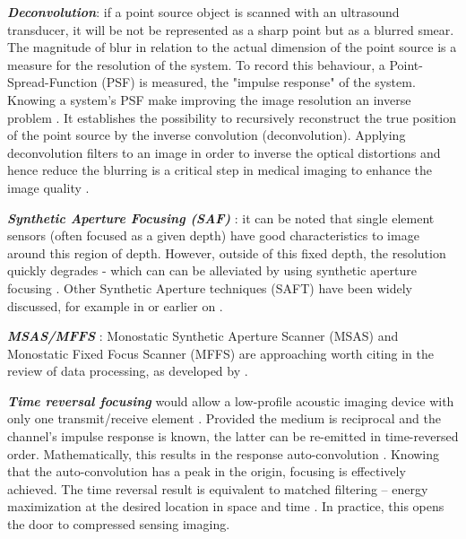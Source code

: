 \documentclass{article}
\begin{document}
\textbf{\textit{Deconvolution}}: if a point source object is scanned with an ultrasound transducer, it will be not be represented as a sharp point but as a blurred smear. The magnitude of blur in relation to the actual dimension of the point source is a measure for the resolution of the system. To record this behaviour, a Point-Spread-Function (PSF) is measured, the "impulse response" of the system.  Knowing a system’s PSF make improving the image resolution an inverse problem  \cite{jensen_deconvolution_1993,dalitz_point_2015}. It establishes the possibility to recursively reconstruct the true position of the point source by the inverse convolution (deconvolution). Applying deconvolution filters to an image in order to inverse the optical distortions and hence reduce the blurring is a critical step in medical imaging to enhance the image quality \cite{dalitz_point_2015}.

\textbf{\textit{Synthetic Aperture Focusing (SAF)}} : it can be noted that single element sensors (often focused as a given depth) have good characteristics to image around this region of depth. However, outside of this fixed depth, the resolution quickly degrades - which can can be alleviated by using synthetic aperture focusing \cite{andresen_synthetic_2011,assef_flexible_2015,li_initial_2018,lewandowski_low-cost_2012,zhang_synthetic_2016}. Other Synthetic Aperture techniques (SAFT) have been widely discussed, for example in \cite{gunarathne_strategies_2013,jeon_novel_2019} or earlier on \cite{burckhardt_experimental_1974} .

\textbf{\textit{MSAS/MFFS}} : Monostatic Synthetic Aperture Scanner (MSAS) and Monostatic Fixed Focus Scanner (MFFS) are approaching worth citing in the review of data processing, as developed by \cite{bottenus_implementation_2015,ylitalo_ultrasound_1994,heuvel_development_2017,nikolov_fast_2008}.  

\textbf{\textit{Time reversal focusing}} would allow a low-profile acoustic imaging device with only one transmit/receive element \cite{etaix_acoustic_2012}. Provided the medium is reciprocal and the channel’s impulse response is known, the latter can be re-emitted in time-reversed order. Mathematically, this results in the response auto-convolution \cite{etaix_acoustic_2012}. Knowing that the auto-convolution has a peak in the origin, focusing is effectively achieved. The time reversal result is equivalent to matched filtering – energy maximization at the desired location in space and time \cite{robin_3d_2017}. In practice, this opens the door to compressed sensing imaging.
\end{document}
